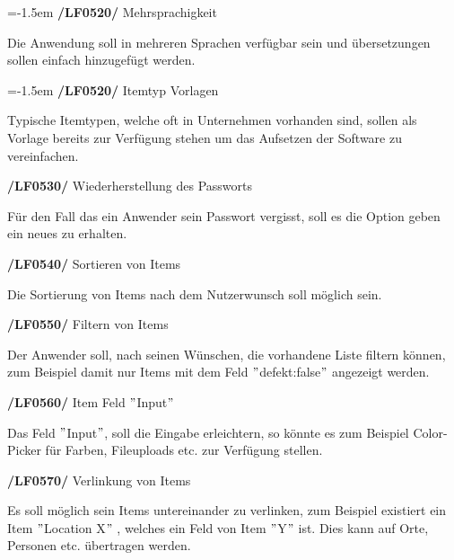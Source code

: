 \documentclass[11pt,a4paper]{report}
\begin{document}
\leftskip=-1.5em
\textbf{/LF0520/} Mehrsprachigkeit
\par
\begingroup
\leftskip=1cm
\noindent Die Anwendung soll in mehreren Sprachen verfügbar sein und übersetzungen sollen einfach hinzugefügt werden.\\
\par
\endgroup

\leftskip=-1.5em
\textbf{/LF0520/} Itemtyp Vorlagen
\par
\begingroup
\leftskip=1cm
\noindent Typische Itemtypen, welche oft in Unternehmen vorhanden sind, 
sollen als Vorlage bereits zur Verfügung stehen um das Aufsetzen der Software zu vereinfachen.\\
\par
\endgroup

\textbf{/LF0530/} Wiederherstellung des Passworts
\par
\begingroup
\leftskip=1cm
\noindent Für den Fall das ein Anwender sein Passwort vergisst, soll es die Option geben ein neues zu erhalten.\\
\par
\endgroup

\textbf{/LF0540/} Sortieren von Items
\par
\begingroup
\leftskip=1cm
\noindent Die Sortierung von Items nach dem Nutzerwunsch soll möglich sein.\\
\par
\endgroup

\textbf{/LF0550/} Filtern von Items
\par
\begingroup
\leftskip=1cm
\noindent Der Anwender soll, nach seinen Wünschen, die vorhandene Liste filtern können, zum Beispiel damit nur Items mit dem Feld $"$defekt:false$"$ angezeigt werden.\\
\par
\endgroup

\textbf{/LF0560/} Item Feld $"$Input$"$
\par
\begingroup
\leftskip=1cm
\noindent Das Feld $"$Input$"$, soll die Eingabe erleichtern, so könnte es zum Beispiel Color-Picker für Farben, Fileuploads etc. zur Verfügung stellen.\\
\par
\endgroup

\newpage
\textbf{/LF0570/} Verlinkung von Items
\par
\begingroup
\leftskip=1cm
\noindent Es soll möglich sein Items untereinander zu verlinken, zum Beispiel existiert ein Item $"$Location X$"$ , welches ein Feld von Item $"$Y$"$ ist.
Dies kann auf Orte, Personen etc. übertragen werden.\\
\par
\endgroup
\end{document}
